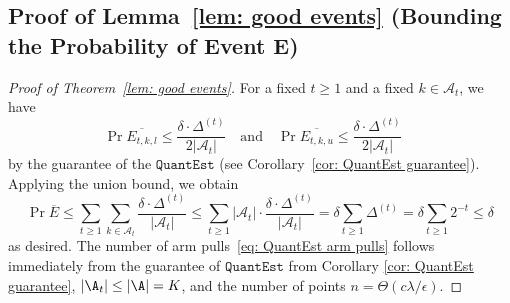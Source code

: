 \subsection{Proof of Lemma~\ref{lem: good events} (Bounding the Probability of Event E) }
\label{sec: proof event E}
\begin{proof}[Proof of Theorem~\ref{lem: good events}]
    For a fixed $t \ge 1$ and a fixed $k \in \mathcal{A}_t$,
    we have
    \begin{equation}
        \Pr{
        \overline{E_{t, k, l}}
        }
        \le  \frac{\delta \cdot \Delta^{(t)}}{2 |\mathcal{A}_t|}
        \quad
        \text{and}
        \quad
         \Pr{
        \overline{E_{t, k, u}}
        }
        \le  \frac{\delta \cdot \Delta^{(t)} }{2 |\mathcal{A}_t|}
        \quad
    \end{equation}
    by the guarantee of the $\mathtt{QuantEst}$ (see Corollary~\ref{cor: QuantEst guarantee}).
    Applying the union bound, we obtain
    \begin{equation}
        \Pr{\overline{E}}
        \le 
        \sum_{t \ge 1}
        \sum_{k \in \mathcal{A}_t} 
        \frac{\delta \cdot \Delta^{(t)}}{ |\mathcal{A}_t|}
        \le 
        \sum_{t \ge 1}
        |\mathcal{A}_t| \cdot 
        \frac{\delta \cdot \Delta^{(t)}}{ |\mathcal{A}_t|}
        =
        \delta
         \sum_{t \ge 1}
         \Delta^{(t)}
         =
         \delta
         \sum_{t \ge 1}
         2^{-t} 
         \le \delta
    \end{equation}
    as desired. The number of arm pulls~\eqref{eq: QuantEst arm pulls} follows immediately from the guarantee of $\mathtt{QuantEst}$ from Corollary \ref{cor: QuantEst guarantee}, $|\A_t| \le |\A| = K$, 
    and the number of points $n = \Theta(c\lambda/\epsilon)$.
\end{proof}